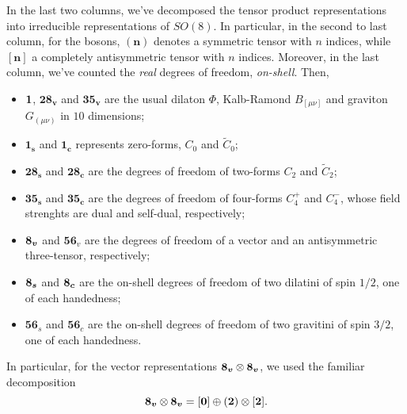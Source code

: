 In the last two columns, we've decomposed the tensor product representations into irreducible representations of $SO(8)$. In particular, in the second to last column, for the bosons, $(\boldsymbol{n})$ denotes a symmetric tensor with $n$ indices, while $[\boldsymbol{n}]$ a completely antisymmetric tensor with $n$ indices. Moreover, in the last column, we've counted the \emph{real} degrees of freedom, \emph{on-shell}. Then,
\begin{itemize}
    \item $\boldsymbol{1}$, $\boldsymbol{28_v}$ and $\boldsymbol{35_v}$ are the usual dilaton $\Phi$, Kalb-Ramond $B_{[\mu\nu]}$ and graviton $G_{(\mu\nu)}$ in $10$ dimensions;
    \item $\boldsymbol{1_s}$ and $\boldsymbol{1_c}$ represents zero-forms, $C_0$ and $\tilde{C}_0$;
    \item $\boldsymbol{28_s}$ and $\boldsymbol{28_c}$ are the degrees of freedom of two-forms $C_2$ and $\tilde{C}_2$;
    \item $\boldsymbol{35_s}$ and $\boldsymbol{35_c}$ are the degrees of freedom of four-forms $C_4^+$ and $C_4^-$, whose field strenghts are dual and self-dual, respectively;
    \item $\boldsymbol{8_v}$ and $\boldsymbol{56}_v$ are the degrees of freedom of a vector and an antisymmetric three-tensor, respectively;
    \item $\boldsymbol{8_s}$ and $\boldsymbol{8_c}$ are the on-shell degrees of freedom of two dilatini of spin $1/2$, one of each handedness;
    \item $\boldsymbol{56}_s$ and $\boldsymbol{56}_c$ are the on-shell degrees of freedom of two gravitini of spin $3/2$, one of each handedness.
\end{itemize}

In particular, for the vector representations $\boldsymbol{8_v} \otimes \boldsymbol{8_v}$, we used the familiar decomposition
\begin{equation}
    \boldsymbol{8_v} \otimes \boldsymbol{8_v} = [\boldsymbol{0}] \oplus (\boldsymbol{2}) \otimes [\boldsymbol{2}].
\end{equation}

